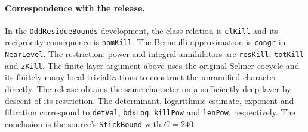 \paragraph{Correspondence with the release.}
In the \texttt{OddResidueBounds} development, the class relation is
\texttt{clKill} and its reciprocity consequence is \texttt{homKill}.
The Bernoulli approximation is \texttt{congr} in \texttt{NearLevel}.
The restriction, power and integral annihilators are
\texttt{resKill}, \texttt{totKill} and \texttt{zKill}.
The finite-layer argument above uses the original Selmer cocycle
and its finitely many local trivializations to construct the
unramified character directly. The release obtains the same character
on a sufficiently deep layer by descent of its restriction.
The determinant, logarithmic estimate, exponent and filtration
correspond to \texttt{detVal}, \texttt{bdxLog}, \texttt{killPow}
and \texttt{lenPow}, respectively. The conclusion is the source's
\texttt{StickBound} with \(C=240\).
